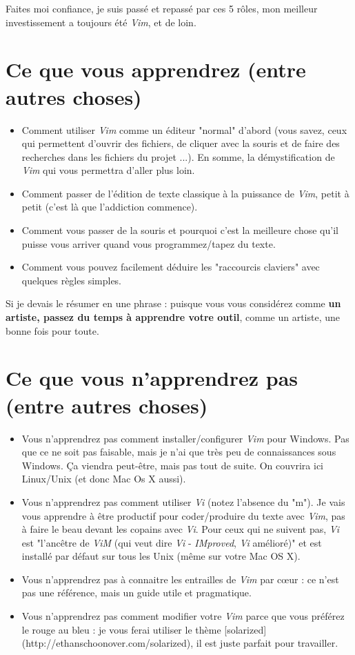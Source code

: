 Faites moi confiance, je suis passé et repassé par ces 5 rôles, mon meilleur investissement a toujours été \emph{Vim}, et de loin.

\section{Ce que vous apprendrez (entre autres choses)}

\begin{itemize}
    \item Comment utiliser \emph{Vim} comme un éditeur "normal" d'abord (vous savez, ceux qui permettent d'ouvrir des fichiers, de cliquer avec la souris et de faire des recherches dans les fichiers du projet ...). En somme, la démystification de \emph{Vim} qui vous permettra d'aller plus loin.
    \item Comment passer de l'édition de texte classique à la puissance de \emph{Vim}, petit à petit (c'est là que l'addiction commence).
    \item Comment vous passer de la souris et pourquoi c'est la meilleure chose qu'il puisse vous arriver quand vous programmez/tapez du texte.
    \item Comment vous pouvez facilement déduire les "raccourcis claviers" avec quelques règles simples.
\end{itemize}

Si je devais le résumer en une phrase : puisque vous vous considérez comme {\bf un artiste, passez du temps à apprendre votre outil}, comme un artiste, une bonne fois pour toute.

\section{Ce que vous n'apprendrez pas (entre autres choses)}

\begin{itemize}
    \item Vous n'apprendrez pas comment installer/configurer {\em Vim} pour Windows. Pas que ce ne soit pas faisable, mais je n'ai que très peu de connaissances sous Windows. Ça viendra peut-être, mais pas tout de suite. On couvrira ici Linux/Unix (et donc Mac Os X aussi).
    \item Vous n'apprendrez pas comment utiliser \emph{Vi} (notez l'absence du "m"). Je vais vous apprendre à être productif pour coder/produire du texte avec \emph{Vim}, pas à faire le beau devant les copains avec \emph{Vi}. Pour ceux qui ne suivent pas, \emph{Vi} est "l'ancêtre de \emph{ViM} (qui veut dire \emph{Vi} - \emph{IMproved}, \emph{Vi} amélioré)" et est installé par défaut sur tous les Unix (même sur votre Mac OS X).
    \item Vous n'apprendrez pas à connaitre les entrailles de \emph{Vim} par c\oe ur : ce n'est pas une référence, mais un guide utile et pragmatique.
    \item Vous n'apprendrez pas comment modifier votre \emph{Vim} parce que vous préférez le rouge au bleu : je vous ferai utiliser le thème [solarized](http://ethanschoonover.com/solarized), il est juste parfait pour travailler.
\end{itemize}

